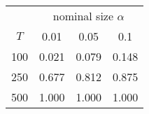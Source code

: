 % 
\begin{tabular}{cccc}
  \hline
  & \multicolumn{3}{c}{nominal size $\alpha$} \\
 $T$ & 0.01 & 0.05 & 0.1 \\
 \hline
100 & 0.021 & 0.079 & 0.148 \\ 
  250 & 0.677 & 0.812 & 0.875 \\ 
  500 & 1.000 & 1.000 & 1.000 \\ 
   \hline
\end{tabular}
